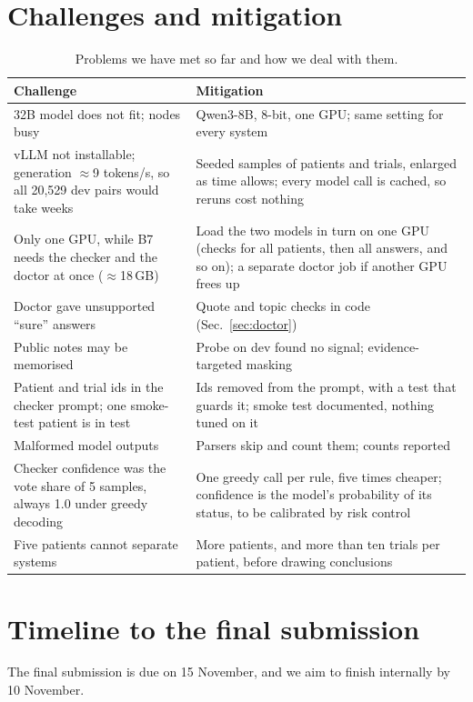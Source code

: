\documentclass[10pt,a4paper,twocolumn]{article}
\begin{document}
\section{Challenges and mitigation}\label{sec:challenges}
\begin{table}[H]
\centering\footnotesize
\begin{tabularx}{\columnwidth}{@{}P{2.9cm}L@{}}
\toprule
\textbf{Challenge} & \textbf{Mitigation}\\
\midrule
32B model does not fit; nodes busy & Qwen3-8B, 8-bit, one GPU; same setting for every system\\
vLLM not installable; generation \(\approx\)9 tokens/s, so all 20{,}529 dev pairs would take weeks & Seeded samples of patients and trials, enlarged as time allows; every model call is cached, so reruns cost nothing\\
Only one GPU, while B7 needs the checker and the doctor at once (\(\approx\)18\,GB) & Load the two models in turn on one GPU (checks for all patients, then all answers, and so on); a separate doctor job if another GPU frees up\\
Doctor gave unsupported ``sure'' answers & Quote and topic checks in code (Sec.~\ref{sec:doctor})\\
Public notes may be memorised & Probe on dev found no signal; evidence-targeted masking\\
Patient and trial ids in the checker prompt; one smoke-test patient is in test & Ids removed from the prompt, with a test that guards it; smoke test documented, nothing tuned on it\\
Malformed model outputs & Parsers skip and count them; counts reported\\
Checker confidence was the vote share of 5 samples, always 1.0 under greedy decoding & One greedy call per rule, five times cheaper; confidence is the model's probability of its status, to be calibrated by risk control\\
Five patients cannot separate systems & More patients, and more than ten trials per patient, before drawing conclusions\\
\bottomrule
\end{tabularx}
\caption{Problems we have met so far and how we deal with them.}
\label{tab:challenges}
\end{table}

\section{Timeline to the final submission}\label{sec:plan}
The final submission is due on 15 November, and we aim to finish internally by 10 November.
\end{document}
